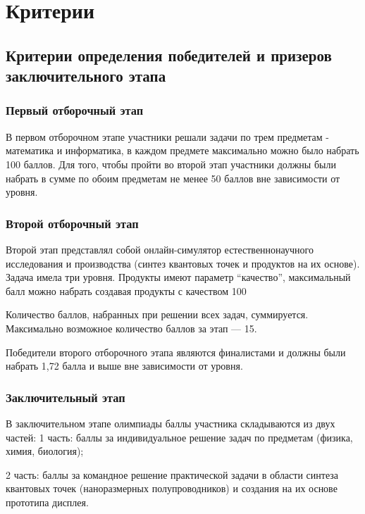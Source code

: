 \part{Критерии}

\chapter{Критерии определения победителей и призеров заключительного этапа}

\section{Первый отборочный этап}
 
В первом отборочном этапе участники решали задачи по трем предметам - математика и информатика, в каждом предмете максимально можно было набрать 100 баллов. Для того, чтобы пройти во второй этап участники должны были набрать в сумме по обоим предметам не менее 50 баллов вне зависимости от уровня.

\section{Второй отборочный этап}

Второй этап представлял собой онлайн-симулятор естественнонаучного исследования и производства (синтез квантовых точек и продуктов на их основе). Задача имела три уровня. Продукты имеют параметр “качество”, максимальный балл можно набрать создавая продукты с качеством 100%

Количество баллов, набранных при решении всех задач, суммируется. Максимально возможное количество баллов за этап — 15.

Победители второго отборочного этапа являются финалистами и должны были набрать 1,72 балла и выше вне зависимости от уровня.

\section{Заключительный этап}

В заключительном этапе олимпиады баллы участника складываются из двух частей: 1 часть: баллы за индивидуальное решение задач по предметам (физика, химия, биология);

2 часть: баллы за командное решение практической задачи в области синтеза квантовых точек (наноразмерных полупроводников) и создания на их основе прототипа дисплея.

